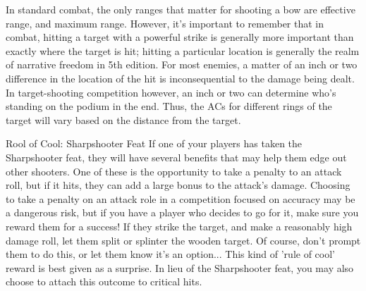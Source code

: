 \documentclass[10pt,a4paper,twoside,twocolumn,openany,bg=print,nodeprecatedcode]{dndbook}
\begin{document}
In standard combat, the only ranges that matter for shooting a bow are effective range, and maximum range. However, it's important to remember that in combat, hitting a target with a powerful strike is generally more important than exactly where the target is hit; hitting a particular location is generally the realm of narrative freedom in 5th edition. For most enemies, a matter of an inch or two difference in the location of the hit is inconsequential to the damage being dealt. In target-shooting competition however, an inch or two can determine who's standing on the podium in the end. Thus, the ACs for different rings of the target will vary based on the distance from the target. 
\begin{DndComment}{Rool of Cool: Sharpshooter Feat}
If one of your players has taken the Sharpshooter feat, they will have several benefits that may help them edge out other shooters. One of these is the opportunity to take a penalty to an attack roll, but if it hits, they can add a large bonus to the attack's damage. Choosing to take a penalty on an attack role in a competition focused on accuracy may be a dangerous risk, but if you have a player who decides to go for it, make sure you reward them for a success! If they strike the target, and make a reasonably high damage roll, let them split or splinter the wooden target. Of course, don't prompt them to do this, or let them know it's an option... This kind of 'rule of cool' reward is best given as a surprise.
In lieu of the Sharpshooter feat, you may also choose to attach this outcome to critical hits.
\end{DndComment}
\end{document}
